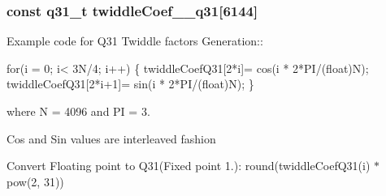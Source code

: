 \subsubsection[{\texorpdfstring{twiddle\+Coef\+\_\+4096\+\_\+q31}{twiddleCoef_4096_q31}}]{\setlength{\rightskip}{0pt plus 5cm}const q31\+\_\+t twiddle\+Coef\+\_\+\_\+q31\mbox{[}6144\mbox{]}}\hypertarget{group__CFFT__CIFFT_ga67c0890317deab3391e276f22c1fc400}{}\label{group__CFFT__CIFFT_ga67c0890317deab3391e276f22c1fc400}
\begin{DoxyParagraph}{}
Example code for Q31 Twiddle factors Generation\+:\+: 
\end{DoxyParagraph}
\begin{DoxyParagraph}{}

\begin{DoxyPre}for(i = 0; i< 3N/4; i++)
\{
   twiddleCoefQ31[2*i]= cos(i * 2*PI/(float)N);
   twiddleCoefQ31[2*i+1]= sin(i * 2*PI/(float)N);
\} \end{DoxyPre}
 
\end{DoxyParagraph}
\begin{DoxyParagraph}{}
where N = 4096 and PI = 3. 
\end{DoxyParagraph}
\begin{DoxyParagraph}{}
Cos and Sin values are interleaved fashion 
\end{DoxyParagraph}
\begin{DoxyParagraph}{}
Convert Floating point to Q31(Fixed point 1.)\+: round(twiddle\+Coef\+Q31(i) $\ast$ pow(2, 31)) 
\end{DoxyParagraph}
